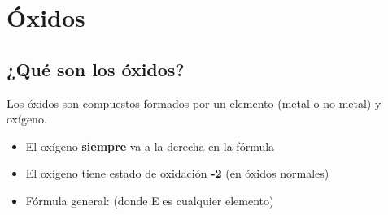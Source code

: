 %
%
%

\section{Óxidos}

\subsection{¿Qué son los óxidos?}

Los óxidos son compuestos formados por un elemento (metal o no metal) y oxígeno.

\begin{itemize}
    \item El oxígeno \textbf{siempre} va a la derecha en la fórmula
    \item El oxígeno tiene estado de oxidación \textbf{-2} (en óxidos normales)
    \item Fórmula general:  (donde E es cualquier elemento)
\end{itemize}

